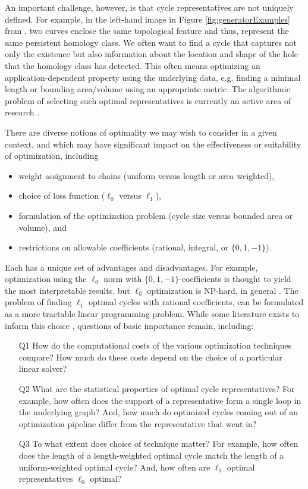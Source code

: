 \documentclass[utf8]{formatting_stuff/frontiersFPHY}
\newcommand{\fig}{Figure }
\theoremstyle{plain}
\theoremstyle{definition}
\begin{document}
An important challenge, however, is that cycle representatives are not uniquely defined. For example, in the left-hand image in \fig \ref{fig:generatorExamples} from \cite{Carlsson2009TopologyAD}, two curves enclose the same topological feature and thus, represent the same persistent homology class. We often want to find a cycle that captures not only the existence but also information about the location and shape of the hole that the homology class has detected. This often means optimizing an application-dependent property using the underlying data, e.g. finding a minimal length or bounding area/volume using an appropriate metric. The algorithmic problem of selecting such optimal representatives is currently an active area of research \cite{dey2011optimal,dey2018,Obayashi2018,wu,chen2010measuring}. 

There are diverse notions of optimality we may wish to consider in a given context, and which may have significant impact on the effectiveness or suitability of  optimization, including  
\begin{itemize}
    \item weight assignment to chains (uniform versus length or area weighted), 
 \item choice of loss function ($\ell_0$ versus $\ell_1$), 
 \item formulation of the optimization problem (cycle size versus bounded area or volume), and \item restrictions on allowable coefficients (rational, integral, or $\{0,1,-1\}$).  
 \end{itemize}
 Each has a unique set of advantages and disadvantages. For example, optimization using the $\ell_0$ norm with $\{0, 1, -1\}$-coefficients is thought to yield the most interpretable results, but $\ell_0$ optimization is NP-hard, in general \cite{chenhardness}. 
The problem of finding $\ell_1$ optimal cycles with rational coefficients, can be formulated as a more tractable linear programming problem.
While some literature exists to inform this choice \cite{dey2011optimal,Escolar2016,Obayashi2018}, questions of basic importance remain, including: 

\begin{enumerate}
  \item[Q1] How do the computational costs of the various optimization techniques compare? How much do these costs depend on the choice of a particular linear solver? 
  \item[Q2] What are the statistical properties of optimal cycle representatives? For example,  how often does the support of a representative form a single loop in the underlying graph? And,  how much do optimized cycles coming out of an optimization pipeline differ from the representative that went in?     
    \item[Q3] To what extent does choice of technique matter? For example, how often does the length of a length-weighted optimal cycle match the length of a uniform-weighted optimal cycle? 
    And, how often are $\ell_1$ optimal representatives $\ell_0$ optimal? 
\end{enumerate}
\end{document}

